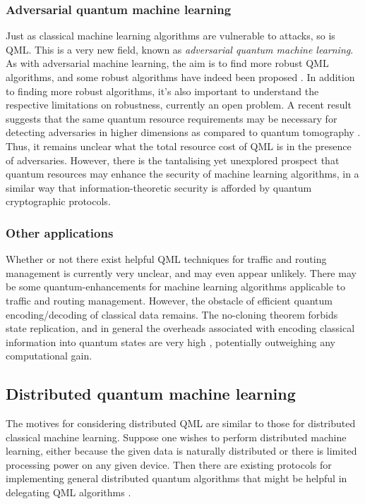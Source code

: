\documentclass[twocolumn, aps, rmp, amsmath, amssymb, nofootinbib, superscriptaddress, longbibliography, floatfix, table-of-contents, eqsecnum]{revtex4}
\begin{document}
\subsubsection{Adversarial quantum machine learning}

Just as classical machine learning algorithms are vulnerable to attacks, so is QML. This is a very new field, known as \textit{adversarial quantum machine learning}. As with adversarial machine learning, the aim is to find more robust QML algorithms, and some robust algorithms have indeed been proposed \cite{bib:wiebe2018hardening}. In addition to finding more robust algorithms, it's also important to understand the respective limitations on robustness, currently an open problem. A recent result suggests that the same quantum resource requirements may be necessary for detecting adversaries in higher dimensions as compared to quantum tomography \cite{bib:advql}. Thus, it remains unclear what the total resource cost of QML is in the presence of adversaries. However, there is the tantalising yet unexplored prospect that quantum resources may enhance the security of machine learning algorithms, in a similar way that information-theoretic security is afforded by quantum cryptographic protocols.

\subsubsection{Other applications}

Whether or not there exist helpful QML techniques for traffic and routing management is currently very unclear, and may even appear unlikely. There may be some quantum-enhancements for machine learning algorithms applicable to traffic and routing management. However, the obstacle of efficient quantum encoding/decoding of classical data remains. The no-cloning theorem forbids state replication, and in general the overheads associated with encoding classical information into quantum states are very high \cite{bib:giovannetti2008quantum, bib:giovannetti2008architectures}, potentially outweighing any computational gain.

\subsection{Distributed quantum machine learning}

The motives for considering distributed QML are similar to those for distributed classical machine learning. Suppose one wishes to perform distributed machine learning, either because the given data is naturally distributed or there is limited processing power on any given device. Then there are existing protocols for implementing general distributed quantum algorithms that might be helpful in delegating QML algorithms \cite{bib:beals2013efficient}.
\end{document}
